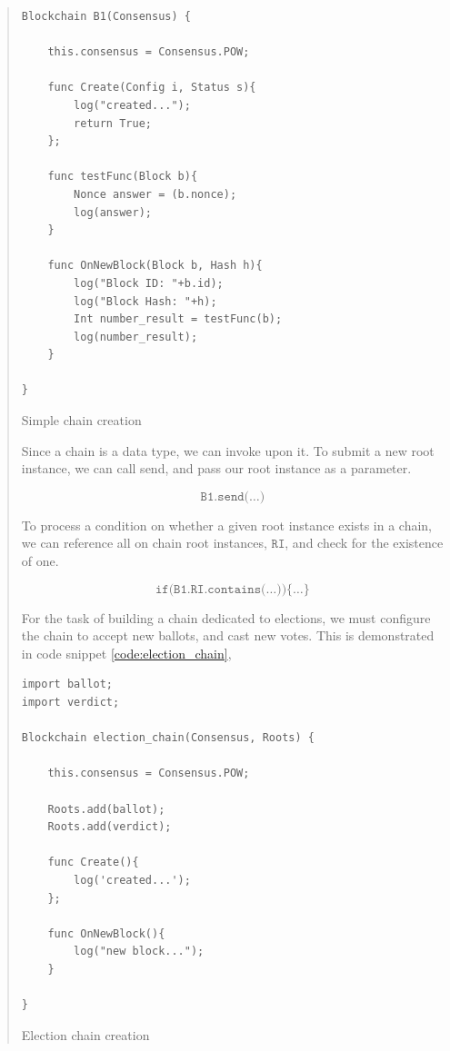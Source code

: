 \documentclass[12pt, titlepage, twocolumn]{report}
\begin{document}
\begin{quotation}
\begin{listing}[ht]
\begin{minipage}{\linewidth}
\begin{lstlisting}
Blockchain B1(Consensus) {

	this.consensus = Consensus.POW;

	func Create(Config i, Status s){ 
		log("created..."); 
		return True; 
	}; 

	func testFunc(Block b){
		Nonce answer = (b.nonce);
		log(answer);
	}

	func OnNewBlock(Block b, Hash h){
		log("Block ID: "+b.id);
		log("Block Hash: "+h);
		Int number_result = testFunc(b);
		log(number_result);
	}

}
\end{lstlisting}
\end{minipage}
\caption{Simple chain creation}
\label{code:simple}
\end{listing}

Since a chain is a data type, we can invoke upon it. To submit a new root instance, we can call send, and pass our root instance as a parameter.

\begin{equation}
\texttt{B1.send(\ldots)}
\end{equation}

To process a condition on whether a given root instance exists in a chain, we can reference all on chain root instances, \(\texttt{RI}\), and check for the existence of one.

\begin{equation}
\texttt{if(B1.RI.contains(\ldots))\{\ldots\}}
\end{equation}

For the task of building a chain dedicated to elections, we must configure the chain to accept new ballots, and cast new votes. This is demonstrated in code snippet \ref{code:election_chain},

\begin{listing}[ht]
\begin{minipage}{\linewidth}
\begin{lstlisting}
import ballot;
import verdict;

Blockchain election_chain(Consensus, Roots) { 

    this.consensus = Consensus.POW;

    Roots.add(ballot);
    Roots.add(verdict);
	
    func Create(){ 
        log('created...'); 
    }; 

    func OnNewBlock(){
        log("new block...");
    }

}
\end{lstlisting}
\end{minipage}
\caption{Election chain creation}
\label{code:election_chain}
\end{listing}




\end{quotation}
\end{document}
